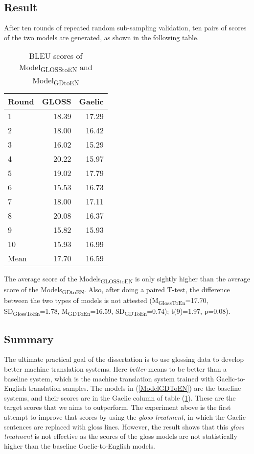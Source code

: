 \documentclass[a4paper]{article}
\begin{document}
\subsection{Result} \label{gdglen_results}
After ten rounds of repeated random sub-sampling validation, ten pairs of scores of the two models are generated, as shown in the following table. 


\begin{table}[ht]
\centering
\begin{tabular}{lrr}
  \hline
Round & GLOSS & Gaelic \\ 
  \hline
1 & 18.39 & 17.29 \\ 
  2 & 18.00 & 16.42 \\ 
  3 & 16.02 & 15.29 \\ 
  4 & 20.22 & 15.97 \\ 
  5 & 19.02 & 17.79 \\ 
  6 & 15.53 & 16.73 \\ 
  7 & 18.00 & 17.11 \\ 
  8 & 20.08 & 16.37 \\ 
  9 & 15.82 & 15.93 \\ 
  10 & 15.93 & 16.99 \\ 
   \hline
Mean & 17.70 & 16.59 \\ 
   \hline
\end{tabular}
\caption{BLEU scores of Model\textsubscript{GLOSStoEN} and Model\textsubscript{GDtoEN}} 
\label{Table:BLEUGlossGD}
\end{table}The average score of the Models\textsubscript{GLOSStoEN} is only sightly higher than the average score of the Models\textsubscript{GDtoEN}. Also, after doing a paired T-test, the difference between the two types of models is not attested (M\textsubscript{GlossToEn}=17.70, SD\textsubscript{GlossToEn}=1.78, M\textsubscript{GDToEn}=16.59, SD\textsubscript{GDToEn}=0.74); t(9)=1.97, p=0.08).

\subsection{Summary}
The ultimate practical goal of the dissertation is to use glossing data to develop better machine translation systems. Here \textit{better} means to be better than a baseline system, which is the machine translation system trained with Gaelic-to-English translation samples. The models in (\ref{ModelGDToEN}) are the baseline systems, and their scores are in the Gaelic column of table (\ref{Table:BLEUGlossGD}). These are the target scores that we aims to outperform. The experiment above is the first attempt to improve that scores by using the \textit{gloss treatment}, in which the Gaelic sentences are replaced with gloss lines.  However, the result shows that this \textit{gloss treatment} is not effective as the scores of the gloss models are not statistically higher than the baseline Gaelic-to-English models.  
\end{document}
